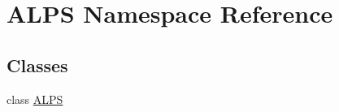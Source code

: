 \hypertarget{namespace_a_l_p_s}{\section{A\-L\-P\-S Namespace Reference}
\label{namespace_a_l_p_s}
}
\subsection*{Classes}
\begin{DoxyCompactItemize}
\item 
class \hyperlink{class_a_l_p_s_1_1_a_l_p_s}{A\-L\-P\-S}
\end{DoxyCompactItemize}

